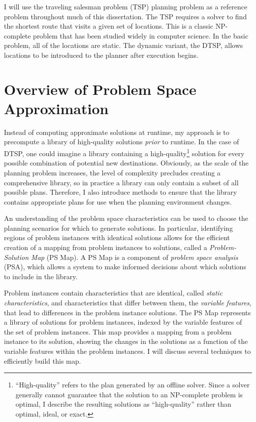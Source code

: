 I will use the traveling salesman problem (TSP) planning problem as a reference problem throughout much of this dissertation.  The TSP requires a solver to find the shortest route that visits a given set of locations.  This is a classic NP-complete problem that has been studied widely in computer science.  In the basic problem, all of the locations are static.  The dynamic variant, the DTSP, allows locations to be introduced to the planner after execution begins.


\section{Overview of Problem Space Approximation}

Instead of computing approximate solutions at runtime, my approach is to precompute a library of high-quality solutions \textit{prior} to runtime.  In the case of DTSP, one could imagine a library containing a high-quality\footnote{``High-quality'' refers to the plan generated by an offline solver.  Since a solver generally cannot guarantee that the solution to an NP-complete problem is optimal, I describe the resulting solutions as ``high-quality'' rather than optimal, ideal, or exact.} solution for every possible combination of potential new destinations.  Obviously, as the scale of the planning problem increases, the level of complexity precludes creating a comprehensive library, so in practice a library can only contain a subset of all possible plans. Therefore, I also introduce methods to ensure that the library contains appropriate plans for use when the planning environment changes.

An understanding of the problem space characteristics can be used to choose the planning scenarios for which to generate solutions.  In particular, identifying regions of problem instances with identical solutions allows for the efficient creation of a mapping from problem instances to solutions, called a \textit{Problem-Solution Map} (PS Map).  A PS Map is a component of \textit{problem space analysis} (PSA), which allows a system to make informed decisions about which solutions to include in the library.

Problem instances contain characteristics that are identical, called \textit{static characteristics}, and characteristics that differ between them, the \textit{variable features}, that lead to differences in the problem instance solutions.  The PS Map represents a library of solutions for problem instances, indexed by the variable features of the set of problem instances.  This map provides a mapping from a problem instance to its solution, showing the changes in the solutions as a function of the variable features within the problem instances.  I will discuss several techniques to efficiently build this map.

